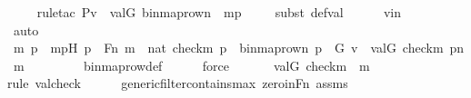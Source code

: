 \begin{isabellebody}
\ \ \ \ \isamarkupfalse%
{\isacharparenleft}{\kern0pt}rule{\isacharunderscore}{\kern0pt}tac\ P{\isacharequal}{\kern0pt}{\isachardoublequoteopen}v\ {\isasymin}\ val{\isacharparenleft}{\kern0pt}G{\isacharcomma}{\kern0pt}\ binmap{\isacharunderscore}{\kern0pt}row{\isacharprime}{\kern0pt}{\isacharparenleft}{\kern0pt}n{\isacharparenright}{\kern0pt}{\isacharparenright}{\kern0pt}{\isachardoublequoteclose}\ \ mp{\isacharparenright}{\kern0pt}\isanewline
\ \ \ \ \isamarkupfalse%
{\isacharparenleft}{\kern0pt}subst\ def{\isacharunderscore}{\kern0pt}val{\isacharparenright}{\kern0pt}\isanewline
\ \ \ \ \isamarkupfalse%
\ vin\ \isanewline
\ \ \ \ \isamarkupfalse%
\ auto\isanewline
\ \ \isamarkupfalse%
\ \isamarkupfalse%
\ m\ p\ \ mpH{\isacharcolon}{\kern0pt}\ {\isachardoublequoteopen}p\ {\isasymin}\ Fn{\isachardoublequoteclose}\ {\isachardoublequoteopen}m\ {\isasymin}\ nat{\isachardoublequoteclose}\ {\isachardoublequoteopen}{\isasymlangle}check{\isacharparenleft}{\kern0pt}m{\isacharparenright}{\kern0pt}{\isacharcomma}{\kern0pt}\ p{\isasymrangle}\ {\isasymin}\ binmap{\isacharunderscore}{\kern0pt}row{\isacharprime}{\kern0pt}{\isacharparenleft}{\kern0pt}n{\isacharparenright}{\kern0pt}{\isachardoublequoteclose}\ {\isachardoublequoteopen}p\ {\isasymin}\ G{\isachardoublequoteclose}\ {\isachardoublequoteopen}v\ {\isacharequal}{\kern0pt}\ val{\isacharparenleft}{\kern0pt}G{\isacharcomma}{\kern0pt}\ check{\isacharparenleft}{\kern0pt}m{\isacharparenright}{\kern0pt}{\isacharparenright}{\kern0pt}{\isachardoublequoteclose}\ {\isachardoublequoteopen}p{\isacharbackquote}{\kern0pt}{\isacharless}{\kern0pt}n{\isacharcomma}{\kern0pt}\ m{\isachargreater}{\kern0pt}\ {\isacharequal}{\kern0pt}\ {}{\isachardoublequoteclose}\ \isanewline
\ \ \ \ \isamarkupfalse%
\ binmap{\isacharunderscore}{\kern0pt}row{\isacharprime}{\kern0pt}{\isacharunderscore}{\kern0pt}def\isanewline
\ \ \ \ \isamarkupfalse%
\ force\isanewline
\ \ \isanewline
\ \ \isamarkupfalse%
\ {\isachardoublequoteopen}val{\isacharparenleft}{\kern0pt}G{\isacharcomma}{\kern0pt}\ check{\isacharparenleft}{\kern0pt}m{\isacharparenright}{\kern0pt}{\isacharparenright}{\kern0pt}\ {\isacharequal}{\kern0pt}\ m{\isachardoublequoteclose}\isanewline
\ \ \ \ \isamarkupfalse%
{\isacharparenleft}{\kern0pt}rule\ valcheck{\isacharparenright}{\kern0pt}\isanewline
\ \ \ \ \isamarkupfalse%
\ generic{\isacharunderscore}{\kern0pt}filter{\isacharunderscore}{\kern0pt}contains{\isacharunderscore}{\kern0pt}max\ zero{\isacharunderscore}{\kern0pt}in{\isacharunderscore}{\kern0pt}Fn\ assms\isanewline

\end{isabellebody}
